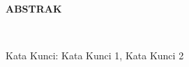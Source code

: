 \clearpage


\normalsize \bfseries \centering \MakeUppercase{Abstrak}
% 
\\[2\baselineskip]

\justifying \normalfont \normalsize{
	\blindtext
}

Kata Kunci: Kata Kunci 1, Kata Kunci 2
\clearpage